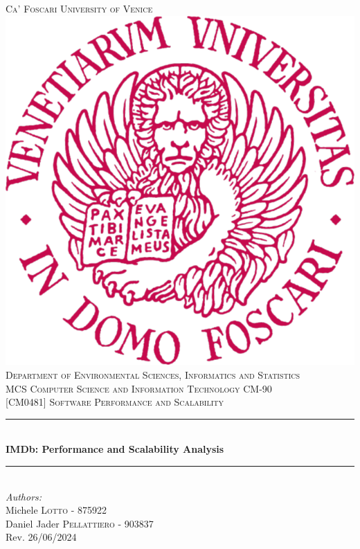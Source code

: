 \documentclass[12pt, twoside]{report}
\begin{document}

	\begin{titlepage}

		\renewcommand{\thesection}{\arabic{section}}
		\newcommand{\HRule}{\rule{\linewidth}{0.2mm}}
		
		\center

		\textsc{\Large Ca' Foscari University of Venice }\\[1.0cm]
		\includegraphics[scale=0.85]{ unive-emblem.png }\\[1cm]
		\textsc{\Large Department of Environmental Sciences, Informatics and Statistics }\\[0.5cm]
		\textsc{\large MCS Computer Science and Information Technology CM-90 }\\[0.5cm]
		\textsc{\large [CM0481] Software Performance and Scalability }\\[0.5cm]
		
		\HRule \\[0.8cm]
		{ \Huge \bfseries IMDb: Performance and Scalability Analysis }\\[0.5cm]
		\HRule \\[0.8cm]
		
		\Large \emph{Authors:}\\
		Michele \textsc{Lotto} - {\normalsize 875922}\\
		Daniel Jader \textsc{Pellattiero} - {\normalsize 903837}\\[3.5cm]

		{\large Rev. 26/06/2024  }\\
		
		\vfill

	\end{titlepage}
\end{document}
